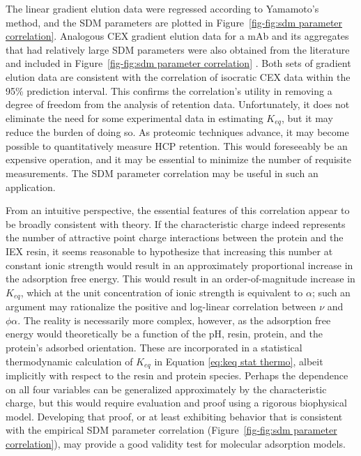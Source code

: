 \documentclass[preprint,review,12pt]{elsarticle}
\begin{document}
        The linear gradient elution data were regressed according to Yamamoto's method, and the SDM parameters are plotted in Figure~\ref{fig-fig:sdm parameter correlation}. Analogous CEX gradient elution data for a mAb and its aggregates that had relatively large SDM parameters were also obtained from the literature and included in Figure~\ref{fig-fig:sdm parameter correlation} \cite{Saleh2020}. Both sets of gradient elution data are consistent with the correlation of isocratic CEX data within the 95\% prediction interval. This confirms the correlation's utility in removing a degree of freedom from the analysis of retention data. Unfortunately, it does not eliminate the need for some experimental data in estimating $K_{eq}$, but it may reduce the burden of doing so. As proteomic techniques advance, it may become possible to quantitatively measure HCP retention. This would foreseeably be an expensive operation, and it may be essential to minimize the number of requisite measurements. The SDM parameter correlation may be useful in such an application.

        From an intuitive perspective, the essential features of this correlation appear to be broadly consistent with theory. If the characteristic charge indeed represents the number of attractive point charge interactions between the protein and the IEX resin, it seems reasonable to hypothesize that increasing this number at constant ionic strength would result in an approximately proportional increase in the adsorption free energy. This would result in an order-of-magnitude increase in $K_{eq}$, which at the unit concentration of ionic strength is equivalent to $\alpha$; such an argument may rationalize the positive and log-linear correlation between $\nu$ and $\phi \alpha$. The reality is necessarily more complex, however, as the adsorption free energy would theoretically be a function of the pH, resin, protein, and the protein's adsorbed orientation.  These are incorporated in a statistical thermodynamic calculation of $K_{eq}$ in Equation \ref{eq:keq stat thermo}, albeit implicitly with respect to the resin and protein species. Perhaps the dependence on all four variables can be generalized approximately by the characteristic charge, but this would require evaluation and proof using a rigorous biophysical model. Developing that proof, or at least exhibiting behavior that is consistent with the empirical SDM parameter correlation (Figure~\ref{fig-fig:sdm parameter correlation}), may provide a good validity test for molecular adsorption models.
\end{document}
